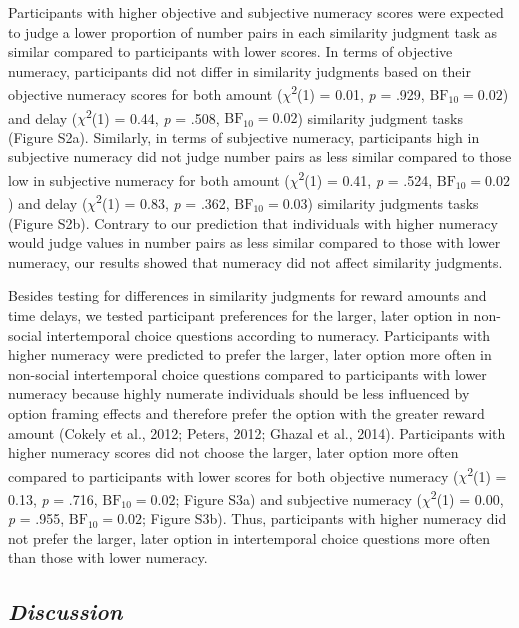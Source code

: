 \documentclass[
  pub,floatsintext]{apa6}
\begin{document}
Participants with higher objective and subjective numeracy scores were expected to judge a lower proportion of number pairs in each similarity judgment task as similar compared to participants with lower scores. In terms of objective numeracy, participants did not differ in similarity judgments based on their objective numeracy scores for both amount (\(\chi\)\textsuperscript{2}(1) = 0.01, \emph{p} = .929, \(\mathrm{BF}_{\textrm{10}} = 0.02\)) and delay (\(\chi\)\textsuperscript{2}(1) = 0.44, \emph{p} = .508, \(\mathrm{BF}_{\textrm{10}} = 0.02\)) similarity judgment tasks (Figure S2a). Similarly, in terms of subjective numeracy, participants high in subjective numeracy did not judge number pairs as less similar compared to those low in subjective numeracy for both amount (\(\chi\)\textsuperscript{2}(1) = 0.41, \emph{p} = .524, \(\mathrm{BF}_{\textrm{10}} = 0.02\)) and delay (\(\chi\)\textsuperscript{2}(1) = 0.83, \emph{p} = .362, \(\mathrm{BF}_{\textrm{10}} = 0.03\)) similarity judgments tasks (Figure S2b). Contrary to our prediction that individuals with higher numeracy would judge values in number pairs as less similar compared to those with lower numeracy, our results showed that numeracy did not affect similarity judgments.

Besides testing for differences in similarity judgments for reward amounts and time delays, we tested participant preferences for the larger, later option in non-social intertemporal choice questions according to numeracy. Participants with higher numeracy were predicted to prefer the larger, later option more often in non-social intertemporal choice questions compared to participants with lower numeracy because highly numerate individuals should be less influenced by option framing effects and therefore prefer the option with the greater reward amount (Cokely et al., 2012; Peters, 2012; Ghazal et al., 2014). Participants with higher numeracy scores did not choose the larger, later option more often compared to participants with lower scores for both objective numeracy (\(\chi\)\textsuperscript{2}(1) = 0.13, \emph{p} = .716, \(\mathrm{BF}_{\textrm{10}} = 0.02\); Figure S3a) and subjective numeracy (\(\chi\)\textsuperscript{2}(1) = 0.00, \emph{p} = .955, \(\mathrm{BF}_{\textrm{10}} = 0.02\); Figure S3b). Thus, participants with higher numeracy did not prefer the larger, later option in intertemporal choice questions more often than those with lower numeracy.

\hypertarget{discussion}{%
\subsection{\texorpdfstring{\emph{Discussion}}{Discussion}}\label{discussion}}
\end{document}
